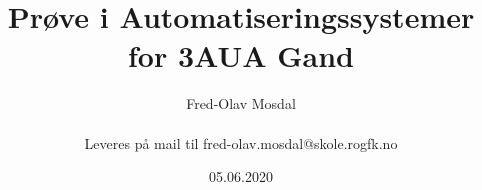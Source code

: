 \title {Prøve i  Automatiseringssystemer for 3AUA Gand} 
\author {Fred-Olav Mosdal \\\\ Leveres på mail til fred-olav.mosdal@skole.rogfk.no }
\date {05.06.2020}
\maketitle
